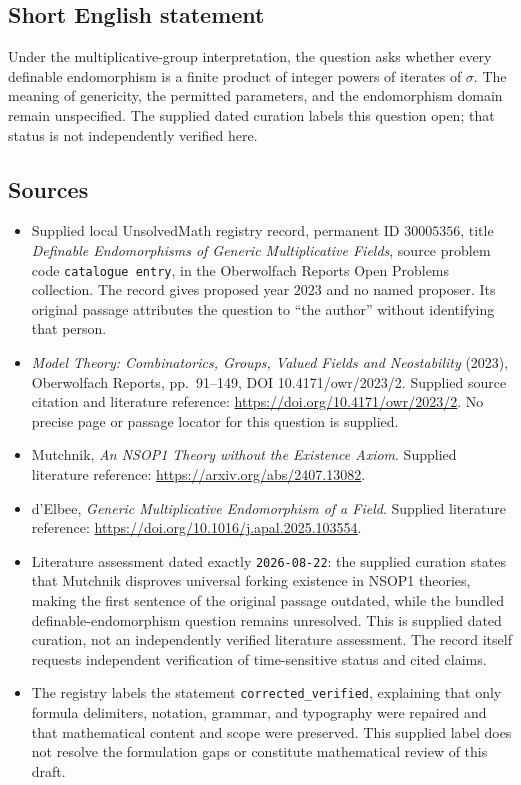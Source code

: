 \documentclass[11pt]{article}
\begin{document}
\subsection{Short English statement}
Under the multiplicative-group interpretation, the question asks whether every definable endomorphism is a finite product of integer powers of iterates of $\sigma$. The meaning of genericity, the permitted parameters, and the endomorphism domain remain unspecified. The supplied dated curation labels this question open; that status is not independently verified here.
\subsection{Sources}
\begin{itemize}
\item Supplied local UnsolvedMath registry record, permanent ID $30005356$, title \emph{Definable Endomorphisms of Generic Multiplicative Fields}, source problem code \texttt{catalogue entry}, in the Oberwolfach Reports Open Problems collection. The record gives proposed year $2023$ and no named proposer. Its original passage attributes the question to ``the author'' without identifying that person.
\item \emph{Model Theory: Combinatorics, Groups, Valued Fields and Neostability} (2023), Oberwolfach Reports, pp.~91--149, DOI 10.4171/owr/2023/2. Supplied source citation and literature reference: \url{https://doi.org/10.4171/owr/2023/2}. No precise page or passage locator for this question is supplied.
\item Mutchnik, \emph{An NSOP1 Theory without the Existence Axiom}. Supplied literature reference: \url{https://arxiv.org/abs/2407.13082}.
\item d'Elbee, \emph{Generic Multiplicative Endomorphism of a Field}. Supplied literature reference: \url{https://doi.org/10.1016/j.apal.2025.103554}.
\item Literature assessment dated exactly \texttt{2026-08-22}: the supplied curation states that Mutchnik disproves universal forking existence in NSOP1 theories, making the first sentence of the original passage outdated, while the bundled definable-endomorphism question remains unresolved. This is supplied dated curation, not an independently verified literature assessment. The record itself requests independent verification of time-sensitive status and cited claims.
\item The registry labels the statement \texttt{corrected\_verified}, explaining that only formula delimiters, notation, grammar, and typography were repaired and that mathematical content and scope were preserved. This supplied label does not resolve the formulation gaps or constitute mathematical review of this draft.
\end{itemize}
\end{document}
